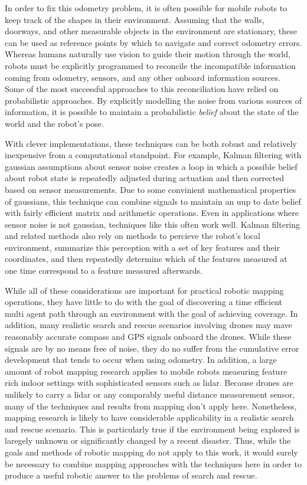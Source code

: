 In order to fix this odometry problem, it is often possible for mobile robots to keep track of the shapes in their environment. Assuming that the walls, doorways, and other measurable objects in the environment are stationary, these can be used as reference points by which to navigate and correct odometry errors. Whereas humans naturally use vision to guide their motion through the world, robots must be explicitly programmed to reconcile the incompatible information coming from odometry, sensors, and any other onboard information sources. Some of the most successful approaches to this reconciliation have relied on probabilistic approaches. By explicitly modelling the noise from various sources of information, it is possible to maintain a probabilistic \textit{belief} about the state of the world and the robot's pose.

With clever implementations, these techniques can be both robust and relatively inexpensive from a computational standpoint. For example, Kalman filtering with gaussian assumptions about sensor noise creates a loop in which a possible belief about robot state is repeatedly adjusted during actuation and then corrected based on sensor measurements. Due to some convinient mathematical properties of gaussians, this technique can combine signals to maintain an uup to date belief with fairly efficient matrix and arithmetic operations. Even in applications where sensor noise is not gaussian, techniques like this often work well. Kalman filtering and related methods also rely on methods to percieve the robot's local environment, summarize this perception with a set of key features and their coordinates, and then repeatedly determine which of the features measured at one time correspond to a feature measured afterwards.

While all of these considerations are important for practical robotic mapping operations, they have little to do with the goal of discovering a time efficient multi agent path through an environment with the goal of achieving coverage. In addition, many realistic search and rescue scenarios involving drones may mave reasonably accurate compass and GPS signals onboard the drones. While these signals are by no means free of noise, they do no suffer from the cumulative error development that tends to occur when using odometry. In addition, a large amount of robot mapping research applies to mobile robots measuring feature rich indoor settings with sophisticated sensors such as lidar. Because drones are unlikely to carry a lidar or any comparably useful distance measurement sensor, many of the techniques and results from mapping don't apply here. Nonetheless, mapping research is likely to have considerable applicability in a realistic search and rescue scenario. This is particularly true if the environment being explored is laregely unknown or significantly changed by a recent disaster. Thus, while the goals and methods of robotic mapping do not apply to this work, it would surely be necessary to combine mapping approaches with the techniques here in order to produce a useful robotic answer to the problems of search and rescue.
